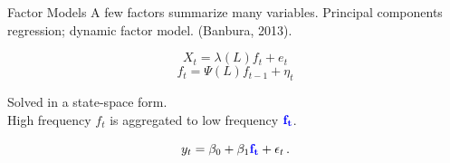 \documentclass[14pt,xcolor=dvipsnames]{beamer}
\begin{document}

 

	





	
	
\begin{frame}{Factor Models}
A few factors summarize many variables. Principal components regression; dynamic factor model. (Banbura, 2013). 
	\begin{block}{}
$$X_t = \lambda (L) f_t + e_t$$
$$f_t = \Psi (L) f_{t-1} + \eta_t$$
	\end{block}
Solved in a state-space form.\\
High frequency $f_t$ is aggregated to low frequency $ \textcolor{blue}{\mathbf{f_t}}$.



	 \begin{block}{}
$$ y_{t} =  \beta_0 +  \beta_1  \textcolor{blue}{\mathbf{f_t}}  + \epsilon_t \,  .$$
	\end{block}

	
	
	
\end{frame}
\end{document}
